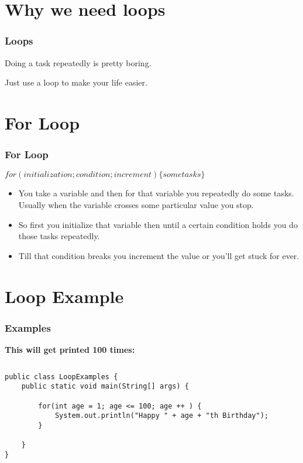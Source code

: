 \documentclass{beamer}
\begin{document}
\section{Why we need loops}

\begin{frame}
\frametitle{Loops}
\centerline{\huge{Doing a task repeatedly is pretty boring.}}
\vspace{0.4in}
\centerline{\huge{Just use a loop to make your life easier.}}

\end{frame}


\section{For Loop}

\begin{frame}[fragile]
\frametitle{For Loop}
\centerline{\Large{ $for(initialization; condition; increment) \{  some tasks \}$  }}
\vspace{0.2in}
\begin{itemize}
\item You take a variable and then for that variable you repeatedly do some tasks. Usually when the variable crosses some particular value you stop.
\item So first you initialize that variable then until a certain condition holds you do those tasks repeatedly.
\item Till that condition breaks you increment the value or you'll get stuck for ever.
\end{itemize}
\end{frame}

\section{Loop Example}

\begin{frame}[fragile]
\frametitle{Examples}
\textbf{This will get printed 100 times:}\\
\begin{columns}[T]
\begin{column}{\textwidth}
\begin{lstlisting}
public class LoopExamples {
    public static void main(String[] args) {

        for(int age = 1; age <= 100; age ++ ) {
            System.out.println("Happy " + age + "th Birthday");
        }

    }
}
\end{lstlisting}
\end{column}
\end{columns}
\end{frame}
\end{document}
